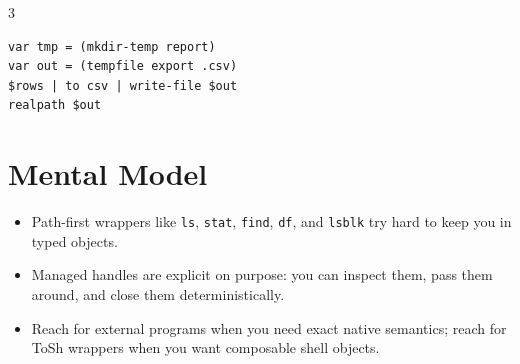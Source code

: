 \begin{multicols*}{3}
\begin{lstlisting}
var tmp = (mkdir-temp report)
var out = (tempfile export .csv)
$rows | to csv | write-file $out
realpath $out
\end{lstlisting}

\section{Mental Model}
\begin{itemize}
\item Path-first wrappers like \texttt{ls}, \texttt{stat}, \texttt{find}, \texttt{df}, and \texttt{lsblk} try hard to keep you in typed objects.
\item Managed handles are explicit on purpose: you can inspect them, pass them around, and close them deterministically.
\item Reach for external programs when you need exact native semantics; reach for ToSh wrappers when you want composable shell objects.
\end{itemize}

\end{multicols*}

